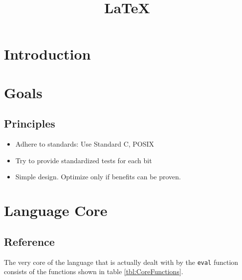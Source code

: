 \documentclass[12pt]{article}
\title{\LaTeX}
\date{}
\begin{document}
\section{Introduction}

\section{Goals}

\subsection{Principles}

\begin{itemize}
    \item Adhere to standards: Use Standard C, POSIX
    \item Try to provide standardized tests for each bit 
    \item Simple design. Optimize only if benefits can be proven.
\end{itemize}

\section{Language Core}

\subsection{Reference}

The very core of the language that is actually dealt with by the \texttt{eval}
function consists of the functions shown in table \ref{tbl:CoreFunctions}.
\end{document}
